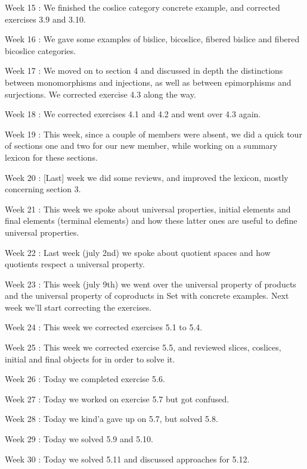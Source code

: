 Week 15 : We finished the coslice category concrete example, and corrected exercises 3.9 and 3.10.

Week 16 : We gave some examples of bislice, bicoslice, fibered bislice and fibered bicoslice categories.

Week 17 : We moved on to section 4 and discussed in depth the distinctions between monomorphisms and injections, as well as between epimorphisms and surjections. We corrected exercise 4.3 along the way.

Week 18 : We corrected exercises 4.1 and 4.2 and went over 4.3 again.

Week 19 : This week, since a couple of members were absent, we did a quick tour of sections one and two for our new member, while working on a summary lexicon for these sections.

Week 20 : [Last] week we did some reviews, and improved the lexicon, mostly concerning section 3.

Week 21 : This week we spoke about universal properties, initial elements and final elements (terminal elements) and how these latter ones are useful to define universal properties.

Week 22 : Last week (july 2nd) we spoke about quotient spaces and how quotients respect a universal property.

Week 23 : This week (july 9th) we went over the universal property of products and the universal property of coproducts in Set with concrete examples. Next week we'll start correcting the exercises.

Week 24 : This week we corrected exercises 5.1 to 5.4.

Week 25 : This week we corrected exercise 5.5, and reviewed slices, coslices, initial and final objects for in order to solve it.

Week 26 : Today we completed exercise 5.6.

Week 27 : Today we worked on exercise 5.7 but got confused.

Week 28 : Today we kind'a gave up on 5.7, but solved 5.8.

Week 29 : Today we solved 5.9 and 5.10.

Week 30 : Today we solved 5.11 and discussed approaches for 5.12.

\newpage
